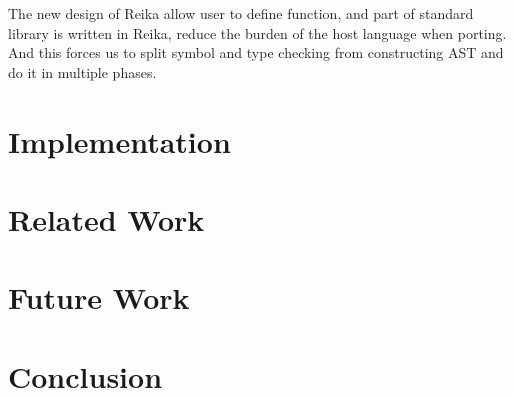 \documentclass{article}
\begin{document}
The new design of Reika allow user to define function, and part of standard library is written in Reika,
reduce the burden of the host language when porting.
And this forces us to split symbol and type checking from constructing AST and do it in multiple phases.




\section{Implementation}
\label{sec:implementation}


\section{Related Work}
\label{sec:related-work}


\section{Future Work}
\label{sec:future-work}

\section{Conclusion}
\label{sec:conclusion}

\printbibliography
\end{document}
